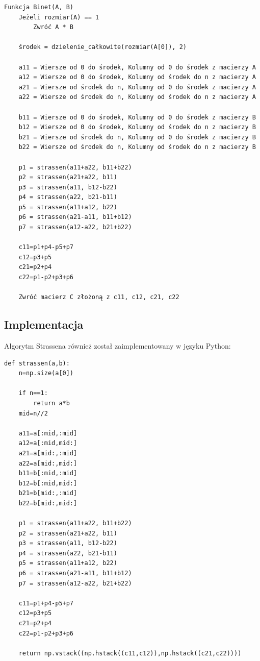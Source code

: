 \documentclass{article}
\begin{document}
\begin{verbatim}
Funkcja Binet(A, B)
    Jeżeli rozmiar(A) == 1
        Zwróć A * B

    środek = dzielenie_całkowite(rozmiar(A[0]), 2) 
    
    a11 = Wiersze od 0 do środek, Kolumny od 0 do środek z macierzy A
    a12 = Wiersze od 0 do środek, Kolumny od środek do n z macierzy A
    a21 = Wiersze od środek do n, Kolumny od 0 do środek z macierzy A
    a22 = Wiersze od środek do n, Kolumny od środek do n z macierzy A
    
    b11 = Wiersze od 0 do środek, Kolumny od 0 do środek z macierzy B
    b12 = Wiersze od 0 do środek, Kolumny od środek do n z macierzy B
    b21 = Wiersze od środek do n, Kolumny od 0 do środek z macierzy B
    b22 = Wiersze od środek do n, Kolumny od środek do n z macierzy B

    p1 = strassen(a11+a22, b11+b22)
    p2 = strassen(a21+a22, b11)
    p3 = strassen(a11, b12-b22)
    p4 = strassen(a22, b21-b11)
    p5 = strassen(a11+a12, b22)
    p6 = strassen(a21-a11, b11+b12)
    p7 = strassen(a12-a22, b21+b22)

    c11=p1+p4-p5+p7
    c12=p3+p5
    c21=p2+p4
    c22=p1-p2+p3+p6

    Zwróć macierz C złożoną z c11, c12, c21, c22
\end{verbatim}

\subsection{Implementacja}

Algorytm Strassena również został zaimplementowany w języku Python:

\begin{verbatim}
def strassen(a,b):
    n=np.size(a[0])
    
    if n==1:
        return a*b
    mid=n//2
    
    a11=a[:mid,:mid]
    a12=a[:mid,mid:]
    a21=a[mid:,:mid]
    a22=a[mid:,mid:]
    b11=b[:mid,:mid]
    b12=b[:mid,mid:]
    b21=b[mid:,:mid]
    b22=b[mid:,mid:]

    p1 = strassen(a11+a22, b11+b22)
    p2 = strassen(a21+a22, b11)
    p3 = strassen(a11, b12-b22)
    p4 = strassen(a22, b21-b11)
    p5 = strassen(a11+a12, b22)
    p6 = strassen(a21-a11, b11+b12)
    p7 = strassen(a12-a22, b21+b22)

    c11=p1+p4-p5+p7
    c12=p3+p5
    c21=p2+p4
    c22=p1-p2+p3+p6

    return np.vstack((np.hstack((c11,c12)),np.hstack((c21,c22))))
\end{verbatim}
\end{document}

